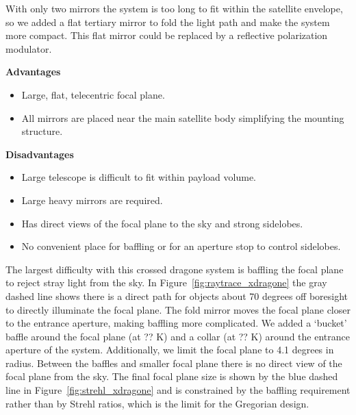 \documentclass[11pt,a4paper]{article}
\begin{document}
With only two mirrors the system is too long to fit within the satellite envelope, so we added a flat 
tertiary mirror to fold the light path and make the system more compact.  This flat mirror 
could be replaced by a reflective polarization modulator. 


\noindent \textbf{Advantages}
\begin{itemize}
	\item Large, flat, telecentric focal plane.
	\item All mirrors are placed near the main satellite body simplifying the mounting structure.
\end{itemize}

\noindent \textbf{Disadvantages}
\begin{itemize}
	\item Large telescope is difficult to fit within payload volume.
	\item Large heavy mirrors are required.
	\item Has direct views of the focal plane to the sky and strong sidelobes.
	\item No convenient place for baffling or for an aperture stop to control sidelobes.
\end{itemize}


The largest difficulty with this crossed dragone system is baffling the focal plane to reject stray light 
from the sky.  In Figure~\ref{fig:raytrace_xdragone} the gray dashed line shows there is a direct path 
for objects about 70 degrees off boresight to directly illuminate the focal plane.  The fold mirror moves 
the focal plane closer to the entrance aperture, making baffling more complicated.  We added a `bucket' 
baffle around the focal plane (at ?? K) and a collar (at ?? K) around the entrance aperture of the system.  Additionally, we 
limit the focal plane to 4.1 degrees in radius.  Between the baffles and smaller focal plane there is no 
direct view of the focal plane from the sky.  The final focal plane size is shown by the blue dashed line 
in Figure~\ref{fig:strehl_xdragone} and is constrained by the baffling requirement rather than by Strehl 
ratios, which is the limit for the Gregorian design.
\end{document}
